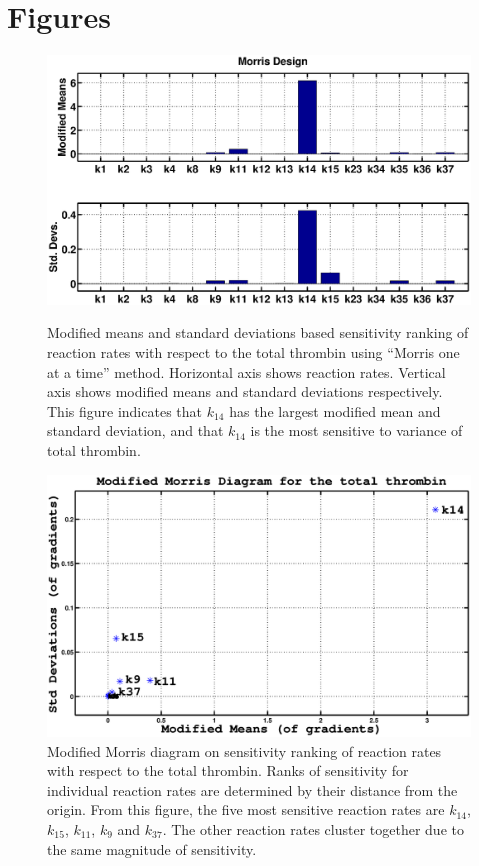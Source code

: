 \section*{Figures}
\begin{figure}
  \begin{center}
  \includegraphics[width=6in]{figures/mean1.eps}
\caption{Modified means and standard deviations based sensitivity
ranking of reaction rates with respect to the total thrombin using
``Morris one at a time'' method. Horizontal axis shows reaction
rates. Vertical axis shows modified means and standard deviations
respectively. This figure indicates  that $k_{14}$ has the largest
modified mean and standard deviation,  and that $k_{14}$ is the most
sensitive to variance of total thrombin. } \label{Fig:mmean}

  \includegraphics[width=6in]{figures/std.eps}
\caption{Modified Morris diagram on sensitivity ranking of reaction
rates with respect to the total thrombin. Ranks of sensitivity for
individual reaction rates are determined by their distance from the
origin. From this figure, the five most sensitive reaction rates are
$k_{14}$, $k_{15}$,  $k_{11}$, $k_{9}$ and $k_{37}$. The other
reaction rates cluster together due to the same magnitude of
sensitivity. } \label{Fig:std}


\end{center}
\end{figure}
